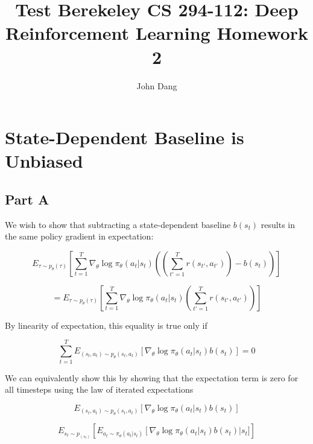 \documentclass{article}
\title{Test Berekeley CS 294-112: Deep Reinforcement Learning Homework 2}
\author{John Dang}
\date{}
\begin{document}
    \maketitle

    \section{State-Dependent Baseline is Unbiased}

    \subsection{Part A}
    We wish to show that subtracting a state-dependent baseline $b(s_t)$ 
    results in the same policy gradient in expectation:

    \begin{equation*}
        E_{\tau\sim p_\theta(\tau)} \left[ \sum_{t=1}^T{\nabla_\theta \log \pi_\theta(a_t|s_t)} \left( \left( \sum_{t'=1}^T{r(s_{t'},a_{t'})} \right) - b(s_t)\right)\right]
    \end{equation*}

    \begin{equation*}
        = E_{\tau\sim p_\theta(\tau)} \left[ \sum_{t=1}^T{\nabla_\theta \log \pi_\theta(a_t|s_t)} \left( \sum_{t'=1}^T{r(s_{t'},a_{t'})}\right)\right]
    \end{equation*}

   By linearity of expectation, this equality is true only if

    \begin{equation*}
       \sum_{t=1}^{T}{ E_{(s_t,a_t)\sim p_\theta(s_t,a_t)} \left[ \nabla_\theta \log \pi_\theta(a_t|s_t) b(s_t)\right]} = 0
    \end{equation*}


    We can equivalently show this by showing that the  expectation term is zero for all timesteps using the law of iterated expectations

    \begin{equation*}
        E_{(s_t,a_t)\sim p_\theta(s_t,a_t)} \left[ \nabla_\theta \log \pi_\theta(a_t|s_t) b(s_t)\right]
    \end{equation*}

    \begin{equation*}
        E_{s_t\sim p_(s_t)} \left[ E_{a_t\sim \pi_\theta(a_t|s_t)}\left[\nabla_\theta \log \pi_\theta(a_t|s_t) b(s_t)\right | s_t]\right]
    \end{equation*}
\end{document}
